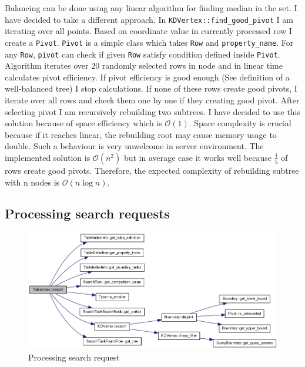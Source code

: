 \documentclass[10pt,a4paper]{article}
\newcommand{\Oh}{\mathcal{O}}
\begin{document}
Balancing can be done using any linear algorithm for finding median in the set. I have decided to take a different approach. In \verb|KDVertex::find_good_pivot| I am iterating over all points. Based on coordinate value in currently processed row I create a \verb|Pivot|. \verb|Pivot| is a simple class which takes \verb|Row| and \verb|property_name|. For any \verb|Row|, \verb|pivot| can check if given \verb|Row| satisfy condition defined inside \verb|Pivot|. Algorithm iterates over 20 randomly selected rows in node and in linear time calculates pivot efficiency. If pivot efficiency is good enough (See definition of a well-balanced tree) I stop calculations. If none of these rows create good pivots, I iterate over all rows and check them one by one if they creating good pivot. After selecting pivot I am recursively rebuilding two subtrees. I have decided to use this solution because of space efficiency which is $\Oh(1)$. Space complexity is crucial because if it reaches linear, the rebuilding root may cause memory usage to double. Such a behaviour is very unwelcome in server environment. The implemented solution is $\Oh(n^2)$ but in average case it works well because $\frac{1}{5}$ of rows create good pivots. Therefore, the expected complexity of rebuilding subtree with n nodes is $\Oh(n \log n)$.

\subsection{Processing search requests}

\begin{figure}
\centering
  \includegraphics[width=16cm]{search}
  \caption{Processing search request}
  \label{fig:search}
\end{figure}
\end{document}
